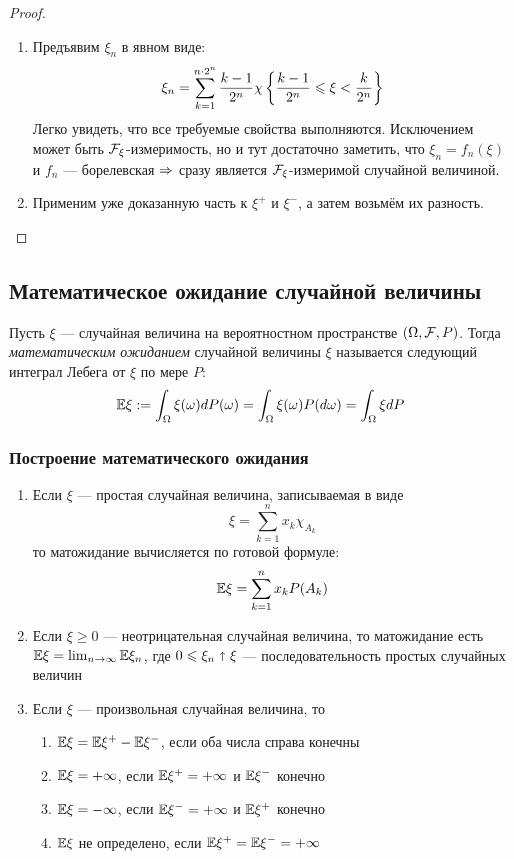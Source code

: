 \begin{proof}~
	\begin{enumerate}
		\item Предъявим $\xi_n$ в явном виде:
		\[
			\xi_n = \sum_{k = 1}^{n \cdot 2^n} \frac{k - 1}{2^n} \chi\left\{\frac{k - 1}{2^n} \leqslant \xi < \frac{k}{2^n}\right\}
		\]
		Легко увидеть, что все требуемые свойства выполняются. Исключением может быть $\mathcal{F}_\xi$-измеримость, но и тут достаточно заметить, что $\xi_n = f_n(\xi)$ и $f_n$ --- борелевская $\Rightarrow$ сразу является $\mathcal{F}_\xi$-измеримой случайной величиной.
		
		\item Применим уже доказанную часть к $\xi^+$ и $\xi^-$, а затем возьмём их разность.
	\end{enumerate}
\end{proof}

\subsection{Математическое ожидание случайной величины}

\begin{definition}
	Пусть $\xi$ --- случайная величина на вероятностном пространстве $(\Omega, \mathcal{F}, P)$. Тогда \textit{математическим ожиданием} случайной величины $\xi$ называется следующий интеграл Лебега от $\xi$ по мере $P$:
	\[
		\mathbb{E}\xi := \int_\Omega \xi(\omega)dP(\omega) = \int_\Omega \xi(\omega)P(d\omega) = \int_\Omega \xi dP
	\]
\end{definition}

\subsubsection*{Построение математического ожидания}

\begin{enumerate}
	\item Если $\xi$ --- простая случайная величина, записываемая в виде
	\[
		\xi = \sum_{k = 1}^n x_k\chi_{A_k}
	\]
	то матожидание вычисляется по готовой формуле:
	\[
		\mathbb{E}\xi = \sum_{k = 1}^n x_kP(A_k)
	\]
	
	\item Если $\xi \ge 0$ --- неотрицательная случайная величина, то матожидание есть $\mathbb{E}\xi = \lim_{n \to \infty} \mathbb{E}\xi_n$, где $0 \leqslant \xi_n \shortuparrow \xi$ --- последовательность простых случайных величин
	
	\item Если $\xi$ --- произвольная случайная величина, то 
	\begin{enumerate}
		\item $\mathbb{E}\xi = \mathbb{E}\xi^+ - \mathbb{E}\xi^-$, если оба числа справа конечны
		
		\item $\mathbb{E}\xi = +\infty$, если $\mathbb{E}\xi^+ = +\infty$ и $\mathbb{E}\xi^-$ конечно
		
		\item $\mathbb{E}\xi = -\infty$, если $\mathbb{E}\xi^- = +\infty$ и $\mathbb{E}\xi^+$ конечно
		
		\item $\mathbb{E}\xi$ не определено, если $\mathbb{E}\xi^+ = \mathbb{E}\xi^- = +\infty$
	\end{enumerate}
\end{enumerate}

